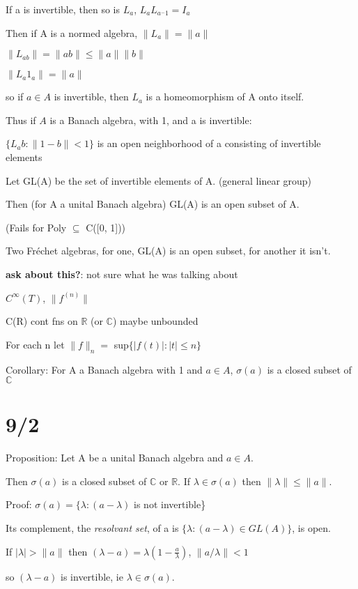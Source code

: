 \documentclass[12pt]{article}
\begin{document}
If a is invertible, then so is $L_a$, $L_aL_{a^-1} = I_a$

Then if A is a normed algebra, $\|L_a\| = \|a\|$

$\|L_{ab}\| = \|ab\| \leq \|a\|\|b\|$

$\|L_a1_a\| = \|a\|$

so if $a \in A$ is invertible, then $L_a$ is a homeomorphism of A onto itself.

Thus if $A$ is a Banach algebra, with 1, and a is invertible:

$\{L_{a}b : \|1 - b\| < 1\}$ is an open neighborhood of a consisting of invertible elements

\noindent
Let GL(A) be the set of invertible elements of A. (general linear group)

Then (for A a unital Banach algebra) GL(A) is an open subset of A.

(Fails for Poly $\subseteq$ C([0, 1]))

\noindent
Two Fr\'{e}chet algebras, for one, GL(A) is an open subset, for another it isn't.

\textbf{ask about this?}: not sure what he was talking about

$C^\infty(T)$, $\|f^{(n)}\|$

C(R) cont fns on $\mathds{R}$ (or $\mathds{C}$) maybe unbounded

For each n let $\|f\|_n = $ sup$\{|f(t)|: |t| \leq n\}$


\noindent
Corollary: For A a Banach algebra with 1 and $a \in A$, $\sigma(a)$ is a closed subset of $\mathds{C}$

\section{9/2}

\noindent
Proposition: Let A be a unital Banach algebra and $a \in A$.

Then $\sigma(a)$ is a closed subset of $\mathds{C}$ or $\mathds{R}$.  If $\lambda \in \sigma(a)$ then $\|\lambda\| \leq \|a\|$.

\noindent
Proof: $\sigma(a) = \{\lambda : (a - \lambda)$ is not invertible\}

Its complement, the \textit{resolvant set}, of a is $\{ \lambda: (a - \lambda) \in GL(A)\}$, is open.

If $|\lambda| > \|a\|$ then $(\lambda - a) = \lambda(1 - \frac{a}{\lambda})$, $\|a\slash \lambda \| < 1$

so $(\lambda - a)$ is invertible, ie $\lambda \in \sigma(a)$.
\end{document}
